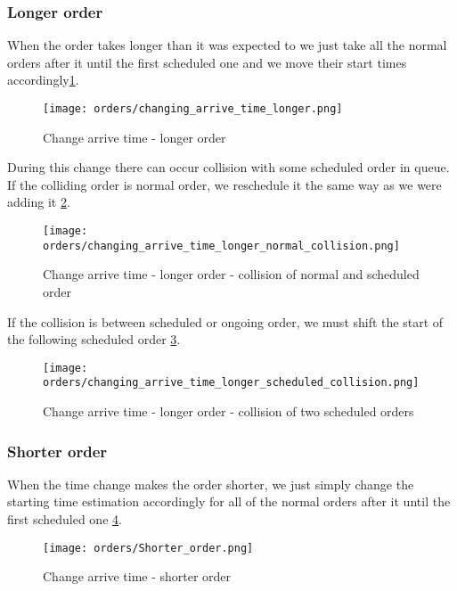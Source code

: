 	\subsubsection{Longer order}
	When the order takes longer than it was expected to we just take all the normal orders after it until the first scheduled one and we move their start times accordingly\ref{order-process-change_longer}.
	\begin{figure}[h]\centering
		\texttt{[image: orders/changing\_arrive\_time\_longer.png]}
		\caption{Change arrive time - longer order} 
		\label{order-process-change_longer}
	\end{figure} 

	During this change there can occur collision with some scheduled order in queue. If the colliding order is normal order, we reschedule it the same way as we were adding it \ref{order-process-change_collision_normal}. 
	
	\begin{figure}[h]\centering
		\texttt{[image: orders/changing\_arrive\_time\_longer\_normal\_collision.png]}
		\caption{Change arrive time - longer order - collision of normal and scheduled order} 
		\label{order-process-change_collision_normal}
	\end{figure} 

	If the collision is between scheduled or ongoing order, we must shift the start of the following scheduled order \ref{order-process-change_collision_scheduled}.
	
	\begin{figure}[h]\centering
		\texttt{[image: orders/changing\_arrive\_time\_longer\_scheduled\_collision.png]}
		\caption{Change arrive time - longer order - collision of two scheduled orders} 
		\label{order-process-change_collision_scheduled}
	\end{figure} 
	
	
	\subsubsection{Shorter order}
		When the time change makes the order shorter, we just simply change the starting time estimation accordingly for all of the normal orders after it until the first scheduled one
		\ref{order-process-change-shorter}.
		
		\begin{figure}[h]\centering
			\texttt{[image: orders/Shorter\_order.png]}
			\caption{Change arrive time - shorter order} 
			\label{order-process-change-shorter}
		\end{figure} 
	
